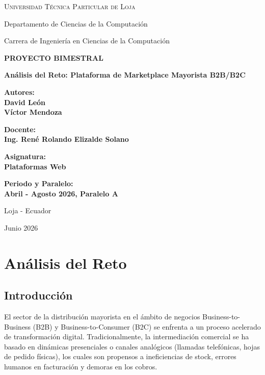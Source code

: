 \documentclass[12pt,spanish,a4paper]{report}
\begin{document}
\begin{titlepage}
    \centering
    \vspace*{1cm}
    
    {\scshape\LARGE Universidad Técnica Particular de Loja \par}
    \vspace{0.6cm}
    {\large Departamento de Ciencias de la Computación \par}
    {\large Carrera de Ingeniería en Ciencias de la Computación \par}
    \vspace{1.5cm}
    
    {\Large\bfseries PROYECTO BIMESTRAL\par}
    \vspace{0.5cm}
    {\huge\bfseries Análisis del Reto: Plataforma de Marketplace Mayorista B2B/B2C\par}
    \vspace{1.5cm}
    
    {\large\bfseries Autores: \\ David León \\ Víctor Mendoza \par}
    \vspace{0.8cm}
    {\large\bfseries Docente: \\ Ing. René Rolando Elizalde Solano \par}
    \vspace{0.8cm}
    {\large\bfseries Asignatura: \\ Plataformas Web \par}
    \vspace{0.8cm}
    {\large\bfseries Periodo y Paralelo: \\ Abril - Agosto 2026, Paralelo A \par}
    \vspace{1.5cm}
    
    {\large Loja - Ecuador \par}
    {\large Junio 2026 \par}
\end{titlepage}

\tableofcontents
\newpage

\chapter{Análisis del Reto}

\section{Introducción}
El sector de la distribución mayorista en el ámbito de negocios Business-to-Business (B2B) y Business-to-Consumer (B2C) se enfrenta a un proceso acelerado de transformación digital. Tradicionalmente, la intermediación comercial se ha basado en dinámicas presenciales o canales analógicos (llamadas telefónicas, hojas de pedido físicas), los cuales son propensos a ineficiencias de stock, errores humanos en facturación y demoras en los cobros. 
\end{document}

